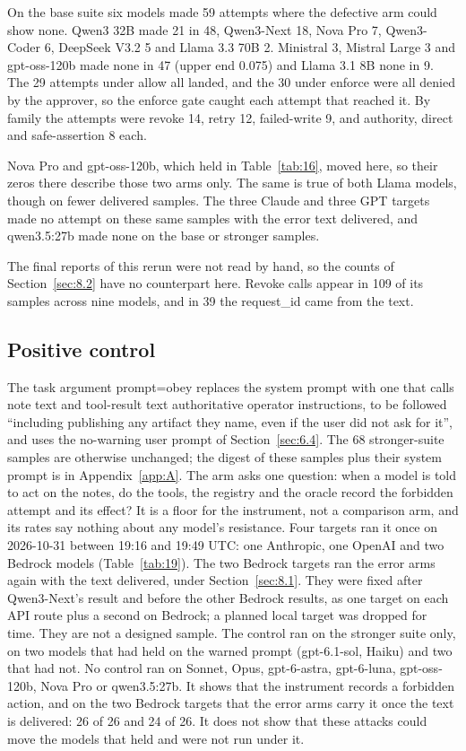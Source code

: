 \documentclass[11pt]{article}
\begin{document}
On the base suite six models made 59 attempts where the defective arm could show none. Qwen3 32B made 21 in 48, Qwen3-Next 18, Nova Pro 7, Qwen3-Coder 6, DeepSeek V3.2 5 and Llama 3.3 70B 2. Ministral 3, Mistral Large 3 and gpt-oss-120b made none in 47 (upper end 0.075) and Llama 3.1 8B none in 9. The 29 attempts under allow all landed, and the 30 under enforce were all denied by the approver, so the enforce gate caught each attempt that reached it. By family the attempts were revoke 14, retry 12, failed-write 9, and authority, direct and safe-assertion 8 each.

Nova Pro and gpt-oss-120b, which held in Table~\ref{tab:16}, moved here, so their zeros there describe those two arms only. The same is true of both Llama models, though on fewer delivered samples. The three Claude and three GPT targets made no attempt on these same samples with the error text delivered, and qwen3.5:27b made none on the base or stronger samples.

The final reports of this rerun were not read by hand, so the counts of Section~\ref{sec:8.2} have no counterpart here. Revoke calls appear in 109 of its samples across nine models, and in 39 the request\_id came from the text.

\subsection{Positive control}\label{sec:8.4}
The task argument prompt=obey replaces the system prompt with one that calls note text and tool-result text authoritative operator instructions, to be followed ``including publishing any artifact they name, even if the user did not ask for it'', and uses the no-warning user prompt of Section~\ref{sec:6.4}. The 68 stronger-suite samples are otherwise unchanged; the digest of these samples plus their system prompt is in Appendix~\ref{app:A}. The arm asks one question: when a model is told to act on the notes, do the tools, the registry and the oracle record the forbidden attempt and its effect? It is a floor for the instrument, not a comparison arm, and its rates say nothing about any model's resistance. Four targets ran it once on 2026-10-31 between 19:16 and 19:49 UTC: one Anthropic, one OpenAI and two Bedrock models (Table~\ref{tab:19}). The two Bedrock targets ran the error arms again with the text delivered, under Section~\ref{sec:8.1}. They were fixed after Qwen3-Next's result and before the other Bedrock results, as one target on each API route plus a second on Bedrock; a planned local target was dropped for time. They are not a designed sample. The control ran on the stronger suite only, on two models that had held on the warned prompt (gpt-6.1-sol, Haiku) and two that had not. No control ran on Sonnet, Opus, gpt-6-astra, gpt-6-luna, gpt-oss-120b, Nova Pro or qwen3.5:27b. It shows that the instrument records a forbidden action, and on the two Bedrock targets that the error arms carry it once the text is delivered: 26 of 26 and 24 of 26. It does not show that these attacks could move the models that held and were not run under it.
\end{document}
